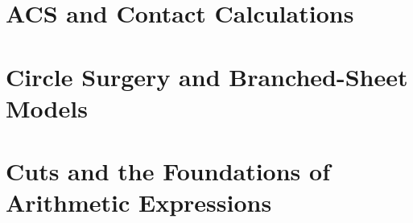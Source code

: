 \documentclass[11pt]{article}
\theoremstyle{definition}
\theoremstyle{remark}
\begin{document}
\section{ACS and Contact Calculations}\label{app:p0-acs-contact}


\section{Circle Surgery and Branched-Sheet Models}\label{app:p0-circle-surgery}


\section{Cuts and the Foundations of Arithmetic Expressions}\label{app:p0-cuts-foundations}


\nocite{Beardon1983DiscreteGroups,Rosen1954ContinuedFractions}


\end{document}
